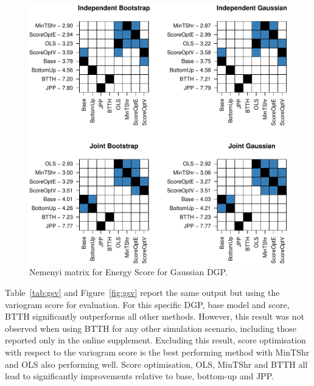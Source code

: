 \documentclass[11pt]{article}
\theoremstyle{definition}
\begin{document}
\begin{figure}[H]
	\centering
	\includegraphics[width=.85\textwidth]{Figs/gse.pdf}
	\caption{Nemenyi matrix for Energy Score for Gaussian DGP.}
	\label{fig:gse}
\end{figure}

Table~\ref{tab:gsv} and Figure~\ref{fig:gsv} report the same output but using the variogram score for evaluation. For this specific DGP, base model and score, BTTH significantly outperforms all other methods. However, this result was not observed when using BTTH for any other simulation scenario, including those reported only in the online supplement. Excluding this result, score optimisation with respect to the variogram score is the best performing method with MinTShr and OLS also performing well. Score optimisation, OLS, MinTShr and BTTH all lead to significantly improvements relative to base, bottom-up and JPP.

\end{document}
